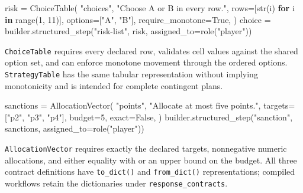 \documentclass[
  10pt,
]{report}
\newenvironment{Shaded}{}{}
\newcommand{\BuiltInTok}[1]{\textcolor[rgb]{0.00,0.50,0.00}{#1}}
\newcommand{\ControlFlowTok}[1]{\textcolor[rgb]{0.00,0.44,0.13}{\textbf{#1}}}
\newcommand{\DecValTok}[1]{\textcolor[rgb]{0.25,0.63,0.44}{#1}}
\newcommand{\KeywordTok}[1]{\textcolor[rgb]{0.00,0.44,0.13}{\textbf{#1}}}
\newcommand{\NormalTok}[1]{#1}
\newcommand{\OperatorTok}[1]{\textcolor[rgb]{0.40,0.40,0.40}{#1}}
\newcommand{\StringTok}[1]{\textcolor[rgb]{0.25,0.44,0.63}{#1}}
\newcommand{\VariableTok}[1]{\textcolor[rgb]{0.10,0.09,0.49}{#1}}
\begin{document}
\begin{Shaded}
\begin{Highlighting}[]
\NormalTok{risk }\OperatorTok{=}\NormalTok{ ChoiceTable(}
    \StringTok{"choices"}\NormalTok{,}
    \StringTok{"Choose A or B in every row."}\NormalTok{,}
\NormalTok{    rows}\OperatorTok{=}\NormalTok{[}\BuiltInTok{str}\NormalTok{(i) }\ControlFlowTok{for}\NormalTok{ i }\KeywordTok{in} \BuiltInTok{range}\NormalTok{(}\DecValTok{1}\NormalTok{, }\DecValTok{11}\NormalTok{)],}
\NormalTok{    options}\OperatorTok{=}\NormalTok{[}\StringTok{"A"}\NormalTok{, }\StringTok{"B"}\NormalTok{],}
\NormalTok{    require\_monotone}\OperatorTok{=}\VariableTok{True}\NormalTok{,}
\NormalTok{)}
\NormalTok{choice }\OperatorTok{=}\NormalTok{ builder.structured\_step(}\StringTok{"risk{-}list"}\NormalTok{, risk, assigned\_to}\OperatorTok{=}\NormalTok{role(}\StringTok{"player"}\NormalTok{))}
\end{Highlighting}
\end{Shaded}

\texttt{ChoiceTable} requires every declared row, validates cell values
against the shared option set, and can enforce monotone movement through
the ordered options. \texttt{StrategyTable} has the same tabular
representation without implying monotonicity and is intended for
complete contingent plans.

\begin{Shaded}
\begin{Highlighting}[]
\NormalTok{sanctions }\OperatorTok{=}\NormalTok{ AllocationVector(}
    \StringTok{"points"}\NormalTok{,}
    \StringTok{"Allocate at most five points."}\NormalTok{,}
\NormalTok{    targets}\OperatorTok{=}\NormalTok{[}\StringTok{"p2"}\NormalTok{, }\StringTok{"p3"}\NormalTok{, }\StringTok{"p4"}\NormalTok{],}
\NormalTok{    budget}\OperatorTok{=}\DecValTok{5}\NormalTok{,}
\NormalTok{    exact}\OperatorTok{=}\VariableTok{False}\NormalTok{,}
\NormalTok{)}
\NormalTok{builder.structured\_step(}\StringTok{"sanction"}\NormalTok{, sanctions, assigned\_to}\OperatorTok{=}\NormalTok{role(}\StringTok{"player"}\NormalTok{))}
\end{Highlighting}
\end{Shaded}

\texttt{AllocationVector} requires exactly the declared targets,
nonnegative numeric allocations, and either equality with or an upper
bound on the budget. All three contract definitions have
\texttt{to\_dict()} and \texttt{from\_dict()} representations; compiled
workflows retain the dictionaries under \texttt{response\_contracts}.
\end{document}
